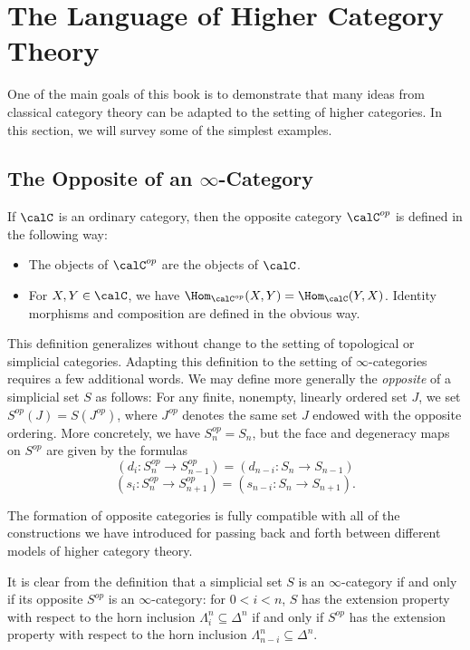 \section{The Language of Higher Category Theory}\label{langur}


\setcounter{theorem}{0}

One of the main goals of this book is to demonstrate that many ideas from classical category theory can be adapted to the setting of higher categories. In this section, we will survey some of the simplest examples.

\subsection{The Opposite of an $\infty$-Category}\label{working}

If $\calC$ is an ordinary category, then the opposite category
$\calC^{op}$ is defined in the following way:

\begin{itemize}
\item The objects of $\calC^{op}$ are the objects of $\calC$.
\item For $X,Y \in \calC$, we have $\Hom_{\calC^{op}}(X,Y) =
\Hom_{\calC}(Y,X)$. Identity morphisms and composition are defined
in the obvious way.
\end{itemize}

This definition generalizes without change to the setting of topological or simplicial categories. Adapting this definition to the setting of $\infty$-categories requires a few additional words.
We may define more generally the {\it opposite} of a simplicial set
$S$ as follows: For any finite, nonempty, linearly ordered set
$J$, we set $S^{op}(J) = S(J^{op})$, where $J^{op}$ denotes the
same set $J$ endowed with the opposite ordering. More concretely,
we have $S^{op}_n = S_n$, but the face and degeneracy maps on
$S^{op}$ are given by the formulas
$$ (d_i: S^{op}_n \rightarrow S^{op}_{n-1}) = (d_{n-i}: S_n
\rightarrow S_{n-1})$$
$$ (s_i: S^{op}_n \rightarrow S^{op}_{n+1}) = (s_{n-i}: S_n
\rightarrow S_{n+1}).$$

The formation of opposite categories is fully compatible
with all of the constructions we have introduced for passing back
and forth between different models of higher category theory.

It is clear from the definition that a simplicial set $S$ is an $\infty$-category if and only if its opposite $S^{op}$ is an $\infty$-category: for $0 < i < n$, $S$ has the extension property
with respect to the horn inclusion $\Lambda^n_i \subseteq \Delta^n$ if
and only if $S^{op}$ has the extension property with respect to the horn inclusion
$\Lambda^n_{n-i} \subseteq \Delta^n$.


